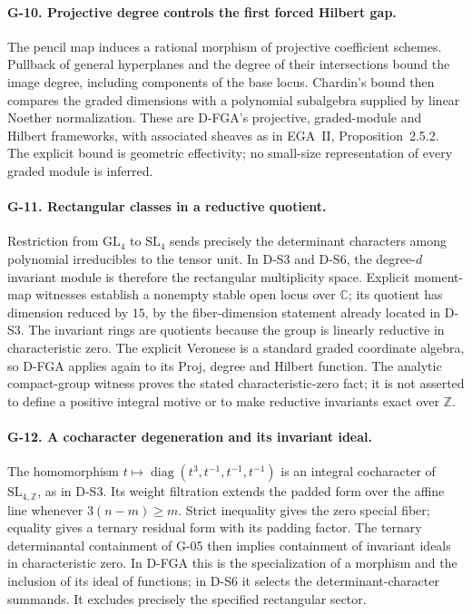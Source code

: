 \paragraph{G-10. Projective degree controls the first forced Hilbert gap.}
The pencil map induces a rational morphism of projective coefficient schemes. Pullback of general hyperplanes and the degree of their intersections bound the image degree, including components of the base locus. Chardin's bound then compares the graded dimensions with a polynomial subalgebra supplied by linear Noether normalization. These are D-FGA's projective, graded-module and Hilbert frameworks, with associated sheaves as in EGA~II, Proposition~2.5.2. The explicit bound is geometric effectivity; no small-size representation of every graded module is inferred.

\paragraph{G-11. Rectangular classes in a reductive quotient.}
Restriction from $\mathrm{GL}_4$ to $\mathrm{SL}_4$ sends precisely the determinant characters among polynomial irreducibles to the tensor unit. In D-S3 and D-S6, the degree-$d$ invariant module is therefore the rectangular multiplicity space. Explicit moment-map witnesses establish a nonempty stable open locus over $\mathbb C$; its quotient has dimension reduced by $15$, by the fiber-dimension statement already located in D-S3. The invariant rings are quotients because the group is linearly reductive in characteristic zero. The explicit Veronese is a standard graded coordinate algebra, so D-FGA applies again to its Proj, degree and Hilbert function. The analytic compact-group witness proves the stated characteristic-zero fact; it is not asserted to define a positive integral motive or to make reductive invariants exact over $\mathbb Z$.

\paragraph{G-12. A cocharacter degeneration and its invariant ideal.}
The homomorphism $t\mapsto\operatorname{diag}(t^3,t^{-1},t^{-1},t^{-1})$ is an integral cocharacter of $\mathrm{SL}_{4,\mathbb Z}$, as in D-S3. Its weight filtration extends the padded form over the affine line whenever $3(n-m)\geq m$. Strict inequality gives the zero special fiber; equality gives a ternary residual form with its padding factor. The ternary determinantal containment of G-05 then implies containment of invariant ideals in characteristic zero. In D-FGA this is the specialization of a morphism and the inclusion of its ideal of functions; in D-S6 it selects the determinant-character summands. It excludes precisely the specified rectangular sector.

